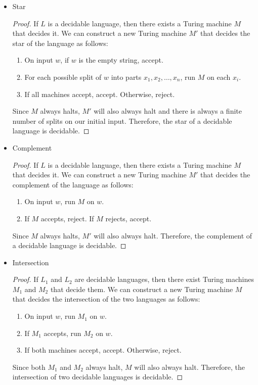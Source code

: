 \documentclass{article}
\begin{document}
\begin{itemize}
    \item Star

    \begin{proof}
        If $L$ is a decidable language, then there exists a Turing machine $M$ that decides it. We can construct a new Turing machine $M'$ that decides the star of the language as follows:
        \begin{enumerate}
            \item On input $w$, if $w$ is the empty string, accept.
            \item For each possible split of $w$ into parts $x_1, x_2, \ldots, x_n$, run $M$ on each $x_i$.
            \item If all machines accept, accept. Otherwise, reject.
        \end{enumerate}

        Since $M$ always halts, $M'$ will also always halt and there is always a finite number of splits on our initial input. Therefore, the star of a decidable language is decidable.
    \end{proof}

    \item Complement
    
    \begin{proof}
        If $L$ is a decidable language, then there exists a Turing machine $M$ that decides it. We can construct a new Turing machine $M'$ that decides the complement of the language as follows:
        \begin{enumerate}
            \item On input $w$, run $M$ on $w$.
            \item If $M$ accepts, reject. If $M$ rejects, accept.
        \end{enumerate}

        Since $M$ always halts, $M'$ will also always halt. Therefore, the complement of a decidable language is decidable.
    \end{proof}

    \item Intersection
    
    \begin{proof}
        If $L_1$ and $L_2$ are decidable languages, then there exist Turing machines $M_1$ and $M_2$ that decide them. We can construct a new Turing machine $M$ that decides the intersection of the two languages as follows:
        \begin{enumerate}
            \item On input $w$, run $M_1$ on $w$.
            \item If $M_1$ accepts, run $M_2$ on $w$.
            \item If both machines accept, accept. Otherwise, reject.
        \end{enumerate}

        Since both $M_1$ and $M_2$ always halt, $M$ will also always halt. Therefore, the intersection of two decidable languages is decidable.
    \end{proof}
\end{itemize}
\end{document}
